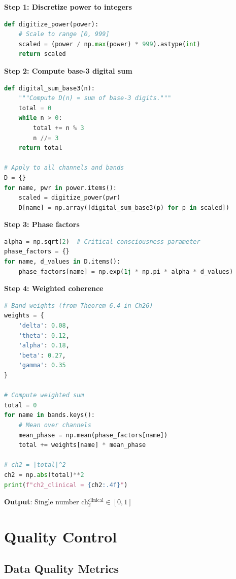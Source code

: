 \begin{algorithm}[H]\caption{Clinical ch$_2$ Calculation}\label{alg:ch2}
\textbf{Step 1: Discretize power to integers}
\begin{lstlisting}[language=Python]
def digitize_power(power):
    # Scale to range [0, 999]
    scaled = (power / np.max(power) * 999).astype(int)
    return scaled
\end{lstlisting}

\textbf{Step 2: Compute base-3 digital sum}
\begin{lstlisting}[language=Python]
def digital_sum_base3(n):
    """Compute D(n) = sum of base-3 digits."""
    total = 0
    while n > 0:
        total += n % 3
        n //= 3
    return total

# Apply to all channels and bands
D = {}
for name, pwr in power.items():
    scaled = digitize_power(pwr)
    D[name] = np.array([digital_sum_base3(p) for p in scaled])
\end{lstlisting}

\textbf{Step 3: Phase factors}
\begin{lstlisting}[language=Python]
alpha = np.sqrt(2)  # Critical consciousness parameter
phase_factors = {}
for name, d_values in D.items():
    phase_factors[name] = np.exp(1j * np.pi * alpha * d_values)
\end{lstlisting}

\textbf{Step 4: Weighted coherence}
\begin{lstlisting}[language=Python]
# Band weights (from Theorem 6.4 in Ch26)
weights = {
    'delta': 0.08,
    'theta': 0.12,
    'alpha': 0.18,
    'beta': 0.27,
    'gamma': 0.35
}

# Compute weighted sum
total = 0
for name in bands.keys():
    # Mean over channels
    mean_phase = np.mean(phase_factors[name])
    total += weights[name] * mean_phase

# ch2 = |total|^2
ch2 = np.abs(total)**2
print(f"ch2_clinical = {ch2:.4f}")
\end{lstlisting}

\textbf{Output}: Single number ch$_2^{\text{clinical}} \in [0, 1]$
\end{algorithm}

\section{Quality Control}

\subsection{Data Quality Metrics}

